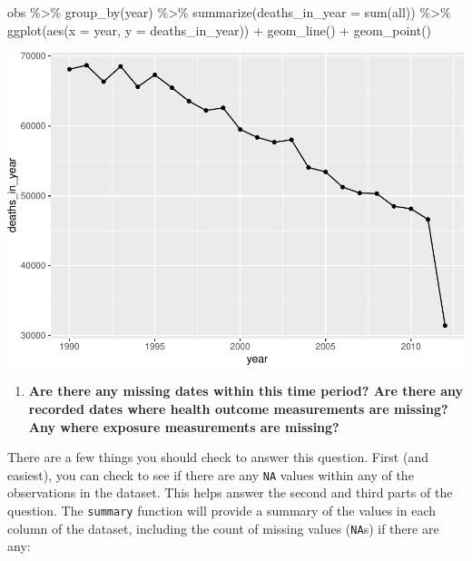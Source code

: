 \documentclass[
]{book}
\newenvironment{Shaded}{\begin{snugshade}}{\end{snugshade}}
\newcommand{\AttributeTok}[1]{\textcolor[rgb]{0.77,0.63,0.00}{#1}}
\newcommand{\FunctionTok}[1]{\textcolor[rgb]{0.00,0.00,0.00}{#1}}
\newcommand{\NormalTok}[1]{#1}
\newcommand{\SpecialCharTok}[1]{\textcolor[rgb]{0.00,0.00,0.00}{#1}}
\providecommand{\tightlist}{%
  \setlength{\itemsep}{0pt}\setlength{\parskip}{0pt}}
\begin{document}
\begin{Shaded}
\begin{Highlighting}[]
\NormalTok{obs }\SpecialCharTok{\%\textgreater{}\%} 
  \FunctionTok{group\_by}\NormalTok{(year) }\SpecialCharTok{\%\textgreater{}\%} 
  \FunctionTok{summarize}\NormalTok{(}\AttributeTok{deaths\_in\_year =} \FunctionTok{sum}\NormalTok{(all)) }\SpecialCharTok{\%\textgreater{}\%} 
  \FunctionTok{ggplot}\NormalTok{(}\FunctionTok{aes}\NormalTok{(}\AttributeTok{x =}\NormalTok{ year, }\AttributeTok{y =}\NormalTok{ deaths\_in\_year)) }\SpecialCharTok{+}
  \FunctionTok{geom\_line}\NormalTok{() }\SpecialCharTok{+}
  \FunctionTok{geom\_point}\NormalTok{() }
\end{Highlighting}
\end{Shaded}

\includegraphics{adv_epi_analysis_files/figure-latex/unnamed-chunk-6-1.pdf}

\begin{enumerate}
\def\labelenumi{\arabic{enumi}.}
\setcounter{enumi}{1}
\tightlist
\item
  \textbf{Are there any missing dates within this time period? Are there any recorded
  dates where health outcome measurements are missing?
  Any where exposure measurements are missing?}
\end{enumerate}

There are a few things you should check to answer this question. First
(and easiest), you can check to see if there are any \texttt{NA} values within
any of the observations in the dataset. This helps answer the second and third
parts of the question. The \texttt{summary} function will provide
a summary of the values in each column of the dataset, including the count
of missing values (\texttt{NA}s) if there are any:
\end{document}
